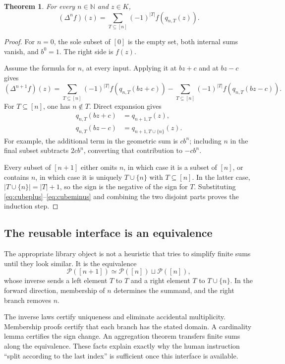 \documentclass[11pt,a4paper]{article}
\newcommand{\N}{\mathbb N}
\newcommand{\Pow}{\mathcal P}
\newtheorem{theorem}{Theorem}[section]
\theoremstyle{remark}
\begin{document}
\begin{theorem}\label{thm:cube}
For every \(n\in\N\) and \(z\in K\),
\begin{equation}\label{eq:cube}
 (\Delta^n f)(z)=\sum_{T\subseteq[n]}(-1)^{|T|}f(q_{n,T}(z)).
\end{equation}
\end{theorem}
\begin{proof}
For \(n=0\), the sole subset of \([0]\) is the empty set, both internal sums vanish, and \(b^0=1\). The right side is \(f(z)\).

Assume the formula for \(n\), at every input. Applying it at \(bz+c\) and at \(bz-c\) gives
\[
 (\Delta^{n+1}f)(z)=
 \sum_{T\subseteq[n]}(-1)^{|T|}f(q_{n,T}(bz+c))
 -\sum_{T\subseteq[n]}(-1)^{|T|}f(q_{n,T}(bz-c)).
\]
For \(T\subseteq[n]\), one has \(n\notin T\). Direct expansion gives
\begin{align}
 q_{n,T}(bz+c)&=q_{n+1,T}(z),\label{eq:cubeplus}\\
 q_{n,T}(bz-c)&=q_{n+1,T\cup\{n\}}(z).\label{eq:cubeminus}
\end{align}
For example, the additional term in the geometric sum is \(cb^n\); including \(n\) in the final subset subtracts \(2cb^n\), converting that contribution to \(-cb^n\).

Every subset of \([n+1]\) either omits \(n\), in which case it is a subset of \([n]\), or contains \(n\), in which case it is uniquely \(T\cup\{n\}\) with \(T\subseteq[n]\). In the latter case,
\(|T\cup\{n\}|=|T|+1\), so the sign is the negative of the sign for \(T\). Substituting \eqref{eq:cubeplus}--\eqref{eq:cubeminus} and combining the two disjoint parts proves the induction step.
\end{proof}

\subsection{The reusable interface is an equivalence}

The appropriate library object is not a heuristic that tries to simplify finite sums until they look similar. It is the equivalence
\[
 \Pow([n+1])\simeq\Pow([n])\sqcup\Pow([n]),
\]
whose inverse sends a left element \(T\) to \(T\) and a right element \(T\) to \(T\cup\{n\}\). In the forward direction, membership of \(n\) determines the summand, and the right branch removes \(n\).

The inverse laws certify uniqueness and eliminate accidental multiplicity. Membership proofs certify that each branch has the stated domain. A cardinality lemma certifies the sign change. An aggregation theorem transfers finite sums along the equivalence. These facts explain exactly why the human instruction ``split according to the last index'' is sufficient once this interface is available.
\end{document}
